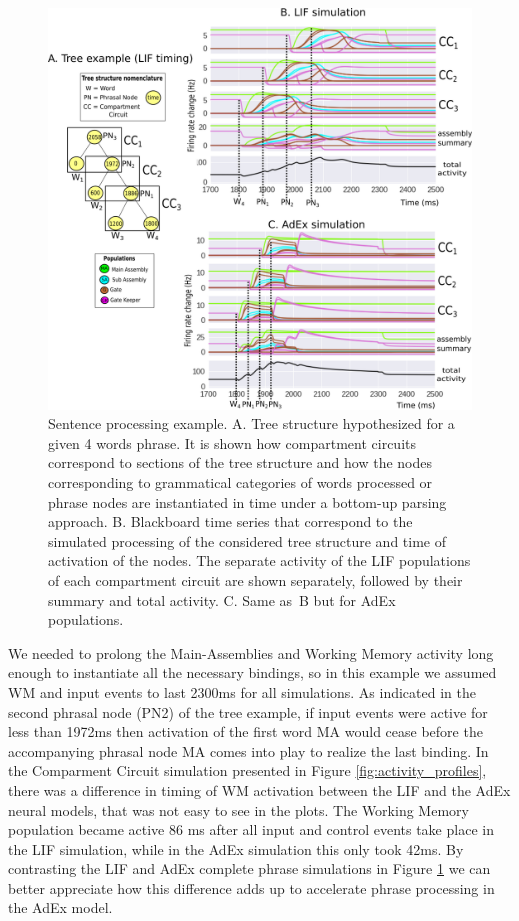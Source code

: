 \documentclass[10pt]{article}
\begin{document}
\begin{figure}[h!]
  \begin{center}
    \includegraphics[width=1.00\columnwidth]{figures/compartments_tree_example}
    \caption{Sentence processing example.
      A. Tree structure hypothesized for a given 4 words phrase.
      It is shown how compartment circuits correspond to sections of the tree structure and how the nodes corresponding to grammatical categories of words processed or phrase nodes are instantiated in time under a bottom-up parsing approach.
      B. Blackboard time series that correspond to the simulated processing of the considered tree structure and time of activation of the nodes.
      The separate activity of the LIF populations of each compartment circuit are shown separately, followed by their summary and total activity.
      C. Same as~B but for AdEx populations. {\label{fig:tree-example}}%
    }
  \end{center}
\end{figure}


We needed to prolong the Main-Assemblies and Working Memory activity long enough to instantiate all the necessary bindings, so in this example we assumed WM and input events to last 2300ms for all simulations.
As indicated in the second phrasal node (PN2) of the tree example, if input events were active for less than 1972ms then activation of the first word MA would cease before the accompanying phrasal node MA comes into play to realize the last binding.
In the Comparment Circuit simulation presented in Figure \ref{fig:activity_profiles}, there was a difference in timing of WM activation between the LIF and the AdEx neural models, that was not easy to see in the plots.
The Working Memory population became active 86 ms after all input and control events take place in the LIF simulation, while in the AdEx simulation this only took 42ms.
By contrasting the LIF and AdEx complete phrase simulations in Figure \ref{fig:tree-example} we can better appreciate how this difference adds up to accelerate phrase processing in the AdEx model.
\end{document}
